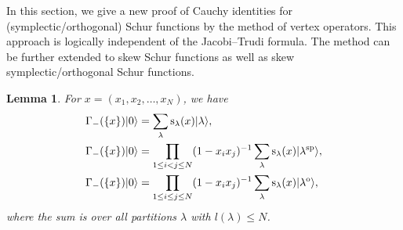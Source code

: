 \documentclass[10pt,a4paper]{amsart}
\numberwithin{equation}{section}
\newtheorem{Lemma}[Theorem]{Lemma}
\begin{document}
In this section, we give a new proof of Cauchy identities for (symplectic/orthogonal) Schur functions by the method of vertex operators. This approach is logically independent of the Jacobi--Trudi formula. The method can be further extended to
skew Schur functions as well as skew symplectic/orthogonal Schur functions.
\begin{Lemma}\label{le5}For $x=(x_1,x_2,\dots,x_N)$, we have
\begin{align}
&\Gamma_-(\{x\})|0\rangle=\sum_{\lambda}{\rm s}_\lambda(x)|\lambda\rangle, \label{e:sc11}\\
&\Gamma_-(\{x\})|0\rangle=\prod_{1\leq i<j\leq N}(1-x_ix_j)^{-1}\sum_{\lambda}{\rm s}_\lambda(x)|\lambda^{\rm sp}\rangle, \nonumber\\ %
&\Gamma_-(\{x\})|0\rangle=\prod_{1\leq i\leq j\leq N}(1-x_ix_j)^{-1}\sum_{\lambda}{\rm s}_\lambda(x)|\lambda^{\rm o}\rangle,\nonumber %
\end{align}
where the sum is over all partitions $\lambda$ with $l(\lambda)\leq N$.
\end{Lemma}
\end{document}
